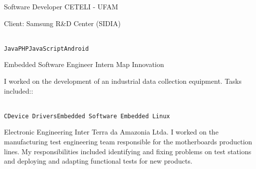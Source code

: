 \documentclass[10pt]{developercv} %
\begin{document}
\begin{entrylist}
  {Software Developer}
  {CETELI - UFAM}
  {
    Client: Samsung R\&D Center (SIDIA)\\
    \begin{contributionlist}
    \end{contributionlist}\\
    \texttt{Java}\slashsep\texttt{PHP}\slashsep\texttt{JavaScript}\slashsep\texttt{Android}}

  {Embedded Software Engineer Intern}
  {Map Innovation}
  {
    I worked on the development of an industrial data collection equipment. 
Tasks included::\\
    \begin{contributionlist}
    \end{contributionlist}\\
\texttt{C}\slashsep\texttt{Device 
Drivers}\slashsep\texttt{Embedded Software}\slashsep\texttt 
{ Embedded Linux }}

  {Electronic Engineering Inter}
  {Terra da Amazonia Ltda.}
  {I worked on the manufacturing test engineering team responsible for the 
motherboards production lines. My responsibilities included identifying and 
fixing problems on test stations and deploying and adapting functional tests for 
new products.}
\end{entrylist}


\begin{minipage}[t]{0.3\textwidth}
  \vspace{-\baselineskip} %


  \begin{skills}
  \end{skills}
\end{minipage}
\end{document}
